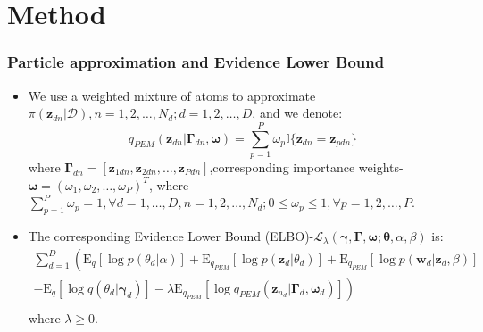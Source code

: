 \documentclass[10pt]{beamer}
\newcommand{\be}{\begin{equation}}
\newcommand{\ee}{\end{equation}}
\newcommand{\bi}{\begin{itemize}}
\newcommand{\ei}{\end{itemize}}
\newcommand{\bs}{\boldsymbol}
\newcommand{\ba}{\begin{array}}
\newcommand{\ea}{\end{array}}
\newcommand{\E}{\mathrm{E}}
\newcommand{\Sum}{\displaystyle\sum}
\begin{document}
\section{Method}	
	\begingroup
	\small%
\begin{frame}
	\frametitle{Particle approximation and Evidence Lower Bound}
	\bi
\item We use a weighted mixture of atoms to approximate $\pi(\bs{z}_{dn}|\mathcal{D}), n=1,2,\ldots,N_d; d=1,2,\ldots,D$, and we denote:\\
\[
q_{PEM}(\bs{z}_{dn}|\bs{\Gamma}_{dn},\bs{\omega})=\Sum_{p=1}^{P}\omega_{p}\mathbb{I}\{\bs{z}_{dn}=\bs{z}_{pdn}\}
\]
where $\bs{\Gamma}_{dn}=[\bs{z}_{1dn},\bs{z}_{2dn},\ldots,\bs{z}_{Pdn}]$,corresponding importance weights-$\bs{\omega}=(\omega_{1},\omega_{2},\ldots,\omega_{P})^T$, where $\sum_{p=1}^{P}\omega_{p}=1,\forall d=1,\ldots,D,n=1,2,\ldots,N_d;0\le\omega_{p}\le 1,\forall p=1,2,\ldots,P$.\\
\vspace{1.5ex}
\item The corresponding Evidence Lower Bound (ELBO)-$\mathcal{L}_{\lambda}(\bs{\gamma},\bs{\Gamma},\bs{\omega};\bs{\theta},\alpha,\beta)$ is:
\be\label{elbo3}
\ba{rl}
\Sum_{d=1}^{D}\left(\E_{q}[\log p(\theta_d|\alpha)]+\E_{q_{PEM}}[\log p(\bs{z}_d|\theta_d)]+\E_{q_{PEM}}[\log p(\bs{w}_d|\bs{z}_d,\beta)]\right.&\\
\left.-\E_{q}[\log q(\theta_d|\bs{\gamma}_d)]-\lambda\E_{q_{PEM}}[\log q_{PEM}(\bs{z}_{n_d}|\bs{\Gamma}_d,\bs{\omega}_d)]\right)&\\
\ea
\ee
where $
\lambda\ge 0$.\\
\ei
\end{frame}	
\endgroup	
\end{document}
